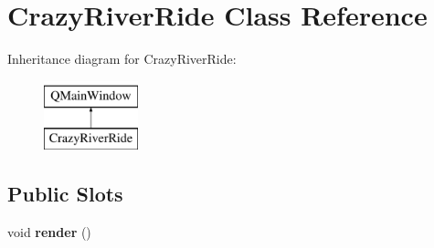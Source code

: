 \hypertarget{class_crazy_river_ride}{\section{Crazy\-River\-Ride Class Reference}
\label{class_crazy_river_ride}
}
Inheritance diagram for Crazy\-River\-Ride\-:\begin{figure}[H]
\begin{center}
\leavevmode
\includegraphics[height=2.000000cm]{class_crazy_river_ride}
\end{center}
\end{figure}
\subsection*{Public Slots}
\begin{DoxyCompactItemize}
\item 
\hypertarget{class_crazy_river_ride_a723a8b3355778a13d7d1e3a3e45d30a0}{void {\bfseries render} ()}\label{class_crazy_river_ride_a723a8b3355778a13d7d1e3a3e45d30a0}

\end{DoxyCompactItemize}
